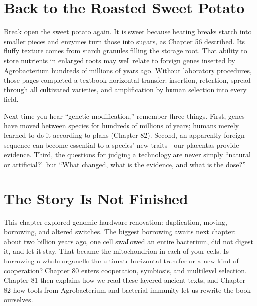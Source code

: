 \section{Back to the Roasted Sweet Potato}

Break open the sweet potato again. It is sweet because heating breaks starch into smaller pieces and enzymes turn those into sugars, as Chapter 56 described. Its fluffy texture comes from starch granules filling the storage root. That ability to store nutrients in enlarged roots may well relate to foreign genes inserted by Agrobacterium hundreds of millions of years ago. Without laboratory procedures, those pages completed a textbook horizontal transfer: insertion, retention, spread through all cultivated varieties, and amplification by human selection into every field.

Next time you hear ``genetic modification,'' remember three things. First, genes have moved between species for hundreds of millions of years; humans merely learned to do it according to plans (Chapter 82). Second, an apparently foreign sequence can become essential to a species' new traits---our placentas provide evidence. Third, the questions for judging a technology are never simply ``natural or artificial?'' but ``What changed, what is the evidence, and what is the dose?''

\section{The Story Is Not Finished}

This chapter explored genomic hardware renovation: duplication, moving, borrowing, and altered switches. The biggest borrowing awaits next chapter: about two billion years ago, one cell swallowed an entire bacterium, did not digest it, and let it stay. That became the mitochondrion in each of your cells. Is borrowing a whole organelle the ultimate horizontal transfer or a new kind of cooperation? Chapter 80 enters cooperation, symbiosis, and multilevel selection. Chapter 81 then explains how we read these layered ancient texts, and Chapter 82 how tools from Agrobacterium and bacterial immunity let us rewrite the book ourselves.

